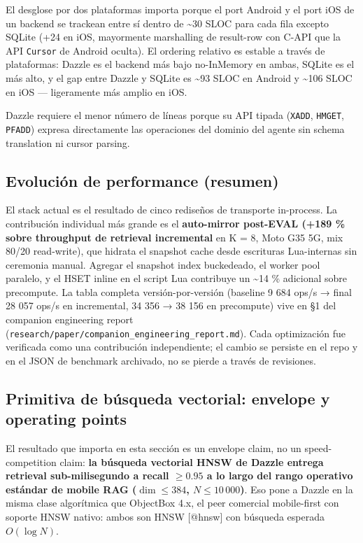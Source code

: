 El desglose por dos plataformas importa porque el port Android y el port iOS de
un backend se trackean entre sí dentro de \textasciitilde30 SLOC para cada fila
excepto SQLite (+24 en iOS, mayormente marshalling de result-row con C-API que
la API \texttt{Cursor} de Android oculta). El ordering relativo es estable a
través de plataformas: Dazzle es el backend más bajo no-InMemory en ambas,
SQLite es el más alto, y el gap entre Dazzle y SQLite es \textasciitilde93 SLOC
en Android y \textasciitilde106 SLOC en iOS --- ligeramente más amplio en iOS.

Dazzle requiere el menor número de líneas porque su API tipada (\texttt{XADD},
\texttt{HMGET}, \texttt{PFADD}) expresa directamente las operaciones del dominio
del agente sin schema translation ni cursor parsing.

\subsection{Evolución de performance
(resumen)}\label{evoluciuxf3n-de-performance-resumen}

El stack actual es el resultado de cinco rediseños de transporte in-process. La
contribución individual más grande es el \textbf{auto-mirror post-EVAL (+189 \%
sobre throughput de retrieval incremental} en K = 8, Moto G35 5G, mix 80/20
read-write), que hidrata el snapshot cache desde escrituras Lua-internas sin
ceremonia manual. Agregar el snapshot index buckedeado, el worker pool paralelo,
y el HSET inline en el script Lua contribuye un \textasciitilde14 \% adicional
sobre precompute. La tabla completa versión-por-versión (baseline 9 684 ops/s →
final 28 057 ops/s en incremental, 34 356 → 38 156 en precompute) vive en §1 del
companion engineering report
(\texttt{research/paper/companion\_engineering\_report.md}). Cada optimización
fue verificada como una contribución independiente; el cambio se persiste en el
repo y en el JSON de benchmark archivado, no se pierde a través de revisiones.

\subsection{Primitiva de búsqueda vectorial: envelope y operating
points}\label{primitiva-de-buxfasqueda-vectorial-envelope-y-operating-points}

El resultado que importa en esta sección es un envelope claim, no un
speed-competition claim: \textbf{la búsqueda vectorial HNSW de Dazzle entrega
retrieval sub-milisegundo a recall \(\geq 0.95\) a lo largo del rango operativo
estándar de mobile RAG (\(\dim \leq 384\), \(N \leq 10\,000\))}. Eso pone a
Dazzle en la misma clase algorítmica que ObjectBox 4.x, el peer comercial
mobile-first con soporte HNSW nativo: ambos son HNSW {[}@hnsw{]} con búsqueda
esperada \(O(\log N)\).

